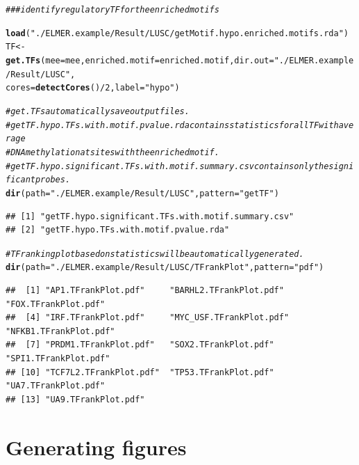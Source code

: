 \documentclass{article}\usepackage[]{graphicx}\usepackage[usenames,dvipsnames]{color}
\makeatletter
\newcommand{\hlnum}[1]{\textcolor[rgb]{0.686,0.059,0.569}{#1}}%
\newcommand{\hlstr}[1]{\textcolor[rgb]{0.192,0.494,0.8}{#1}}%
\newcommand{\hlcom}[1]{\textcolor[rgb]{0.678,0.584,0.686}{\textit{#1}}}%
\newcommand{\hlopt}[1]{\textcolor[rgb]{0,0,0}{#1}}%
\newcommand{\hlstd}[1]{\textcolor[rgb]{0.345,0.345,0.345}{#1}}%
\newcommand{\hlkwb}[1]{\textcolor[rgb]{0.69,0.353,0.396}{#1}}%
\newcommand{\hlkwc}[1]{\textcolor[rgb]{0.333,0.667,0.333}{#1}}%
\newcommand{\hlkwd}[1]{\textcolor[rgb]{0.737,0.353,0.396}{\textbf{#1}}}%
\newenvironment{kframe}{%
 \def\at@end@of@kframe{}%
 \ifinner\ifhmode%
  \def\at@end@of@kframe{\end{minipage}}%
  \begin{minipage}{\columnwidth}%
 \fi\fi%
 \def\FrameCommand##1{\hskip\@totalleftmargin \hskip-\fboxsep
 \colorbox{shadecolor}{##1}\hskip-\fboxsep
     \hskip-\linewidth \hskip-\@totalleftmargin \hskip\columnwidth}%
 \MakeFramed {\advance\hsize-\width
   \@totalleftmargin\z@ \linewidth\hsize
   \@setminipage}}%
 {\par\unskip\endMakeFramed%
 \at@end@of@kframe}
\newenvironment{knitrout}{}{} %
\makeatother
\begin{document}
\begin{knitrout}
\color{fgcolor}\begin{kframe}
\begin{alltt}
\hlcom{### identify regulatory TF for the enriched motifs}

\hlkwd{load}\hlstd{(}\hlstr{"./ELMER.example/Result/LUSC/getMotif.hypo.enriched.motifs.rda"}\hlstd{)}
\hlstd{TF} \hlkwb{<-} \hlkwd{get.TFs}\hlstd{(}\hlkwc{mee}\hlstd{=mee,} \hlkwc{enriched.motif}\hlstd{=enriched.motif,}\hlkwc{dir.out}\hlstd{=}\hlstr{"./ELMER.example/Result/LUSC"}\hlstd{,}
              \hlkwc{cores}\hlstd{=}\hlkwd{detectCores}\hlstd{()}\hlopt{/}\hlnum{2}\hlstd{,} \hlkwc{label}\hlstd{=} \hlstr{"hypo"}\hlstd{)}

\hlcom{# get.TFs automatically save output files. }
\hlcom{# getTF.hypo.TFs.with.motif.pvalue.rda contains statistics for all TF with average }
\hlcom{# DNA methylation at sites with the enriched motif.}
\hlcom{# getTF.hypo.significant.TFs.with.motif.summary.csv contains only the significant probes.}
\hlkwd{dir}\hlstd{(}\hlkwc{path} \hlstd{=} \hlstr{"./ELMER.example/Result/LUSC"}\hlstd{,} \hlkwc{pattern} \hlstd{=} \hlstr{"getTF"}\hlstd{)}
\end{alltt}
\begin{verbatim}
## [1] "getTF.hypo.significant.TFs.with.motif.summary.csv"
## [2] "getTF.hypo.TFs.with.motif.pvalue.rda"
\end{verbatim}
\begin{alltt}
\hlcom{# TF ranking plot based on statistics will be automatically generated.}
\hlkwd{dir}\hlstd{(}\hlkwc{path} \hlstd{=} \hlstr{"./ELMER.example/Result/LUSC/TFrankPlot"}\hlstd{,} \hlkwc{pattern} \hlstd{=} \hlstr{"pdf"}\hlstd{)}
\end{alltt}
\begin{verbatim}
##  [1] "AP1.TFrankPlot.pdf"     "BARHL2.TFrankPlot.pdf"  "FOX.TFrankPlot.pdf"    
##  [4] "IRF.TFrankPlot.pdf"     "MYC_USF.TFrankPlot.pdf" "NFKB1.TFrankPlot.pdf"  
##  [7] "PRDM1.TFrankPlot.pdf"   "SOX2.TFrankPlot.pdf"    "SPI1.TFrankPlot.pdf"   
## [10] "TCF7L2.TFrankPlot.pdf"  "TP53.TFrankPlot.pdf"    "UA7.TFrankPlot.pdf"    
## [13] "UA9.TFrankPlot.pdf"
\end{verbatim}
\end{kframe}
\end{knitrout}

\section{Generating figures}
\end{document}
